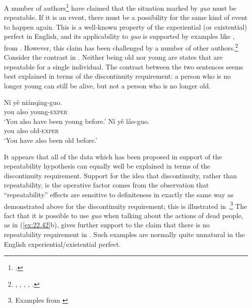 A number of authors\footnote{\textcites{Ma1977}[230]{LiThompson1981}{Yeh1996}[268]{Smith1997}.} have claimed that the situation marked by \textit{guo} must be repeatable. If it is an event, there must be a possibility for the same kind of event to happen again. This is a well-known property of the experiential (or existential) perfect in English, and its applicability to \textit{guo} is supported by examples like , from \citet[15]{Ma1977}. However, this claim has been challenged by a number of other authors.\footnote{\citet{Chen1979}, \citet{Iljic1990}, \citet[147--148]{XiaoMcEnery2004},  \citet{PanLee2004}, \citet{Lin2007}.} Consider the contrast in . Neither being old nor young are states that are repeatable for a single individual. The contrast between the two sentences seems best explained in terms of the discontinuity requirement: a person who is no longer young can still be alive, but not a person who is no longer old.


\ex \label{ex:22.41}
\ea  \gll Nǐ  yě  niánqīng-guo.\\
you  also  young-\textsc{exper}\\
\glt ‘You also have been young before.’ 
\ex \gll *Nǐ  yě  lǎo-guo.\\
you  also  old-\textsc{exper}\\
\glt ‘You have also been old before.’
\z \z


It appears that all of the data which has been proposed in support of the repeatability hypothesis can equally well be explained in terms of the discontinuity requirement. Support for the idea that discontinuity, rather than repeatability, is the operative factor comes from the observation that “repeatability” effects are sensitive to definiteness in exactly the same way as demonstrated above for the discontinuity requirement; this is illustrated in .\footnote{Examples from \citet[153, 163]{Yeh1996}} The fact that it is possible to use \textit{guo} when talking about the actions of dead people, as in (\ref{ex:22.42}b), gives further support to the claim that there is no repeatability requirement in . Such examples are normally quite unnatural in the English experiential/existential perfect.


\ea \label{ex:22.42}
\z \z



